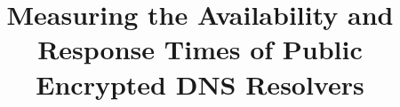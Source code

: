 \documentclass[runningheads]{llncs}
\begin{document}
\title{Measuring the Availability and Response Times of Public Encrypted DNS Resolvers}
\author{}
\institute{}


\maketitle

\begin{sloppypar}





\label{lastpage}

\pagebreak





\end{sloppypar}
\end{document}
